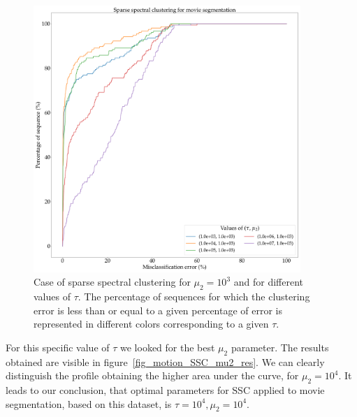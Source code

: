 \documentclass[12pt,a4paper,onecolumn]{article}
\begin{document}
\begin{figure}[H]
	\centering
	\includegraphics[width = 0.9\textwidth]{SSC_tau}
	\caption{Case of sparse spectral clustering for \(\mu_2 = 10^3\) and for different values of \(\tau\). The percentage of sequences for which the clustering error is less than or equal to a given percentage of error is represented in different colors corresponding to a given \(\tau\).}
	\label{fig_motion_SSC_tau_res}
\end{figure}

For this specific value of \(\tau\) we looked for the best \(\mu_2\) parameter. The results obtained are visible in figure~\ref{fig_motion_SSC_mu2_res}. We can clearly distinguish the profile obtaining the higher area under the curve, for \(\mu_2 = 10^{4}\). It leads to our conclusion, that optimal parameters for SSC applied to movie segmentation, based on this dataset, is \(\tau = 10^4, \mu_2 = 10^{4}\).
\end{document}

